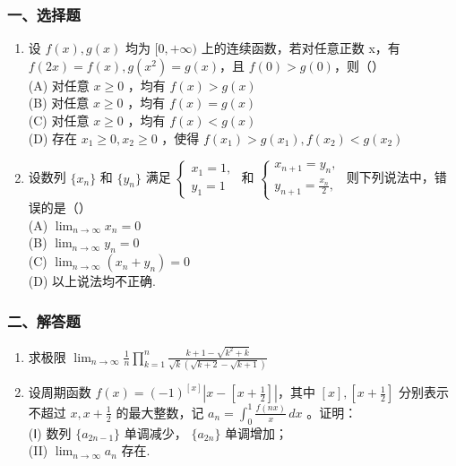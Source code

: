 \documentclass[12pt, a4paper]{ctexart}
\begin{document}
\subsubsection*{一、选择题}

\begin{enumerate}
    \item 设 $ f(x), g(x) $ 均为 $ [0, +\infty) $ 上的连续函数，若对任意正数 x，有 $ f(2x) = f(x), g(x^2) = g(x) $，且 $ f(0) > g(0) $，则（）\\
    (A) 对任意 $ x \geq 0 $ ，均有 $ f(x) > g(x) $\\
    (B) 对任意 $ x \geq 0 $ ，均有 $ f(x) = g(x) $\\
    (C) 对任意 $ x \geq 0 $ ，均有 $ f(x) < g(x) $\\
    (D) 存在 $ x_{1} \geq 0, x_{2} \geq 0 $ ，使得 $ f(x_{1}) > g(x_{1}), f(x_{2}) < g(x_{2}) $

    \item 设数列 $ \{x_{n}\} $ 和 $ \{y_{n}\} $ 满足 $ \begin{cases} x_{1}=1, \\ y_{1}=1 \end{cases} $ 和 $ \begin{cases} x_{n+1}=y_{n}, \\ y_{n+1}=\frac{x_{n}}{2}, \end{cases} $ 则下列说法中，错误的是（）\\
    (A) $ \lim_{n\to\infty}x_n=0 $\\
    (B) $ \lim_{n\to\infty}y_n=0 $\\
    (C) $ \lim_{n\to\infty}(x_n+y_n)=0 $\\
    (D) 以上说法均不正确.
\end{enumerate}

\subsubsection*{二、解答题}

\begin{enumerate}[start=3]
    \item 求极限 $ \lim_{n\to\infty}\frac{1}{n}\prod_{k=1}^{n}\frac{k+1-\sqrt{k^{2}+k}}{\sqrt{k}\left(\sqrt{k+2}-\sqrt{k+1}\right)} $

    \item 设周期函数 $ f(x) = (-1)^{[x]} \left| x - \left[ x + \frac{1}{2} \right] \right| $，其中 $ [x], \left[ x + \frac{1}{2} \right] $ 分别表示不超过 $ x, x + \frac{1}{2} $ 的最大整数，记 $ a_n = \int_0^1 \frac{f(nx)}{x} \, dx $ 。证明：\\
    (Ⅰ) 数列 $ \{a_{2n-1}\} $ 单调减少， $ \{a_{2n}\} $ 单调增加；\\
    (II) $ \lim_{n\to\infty}a_{n} $ 存在.
\end{enumerate}
\end{document}
